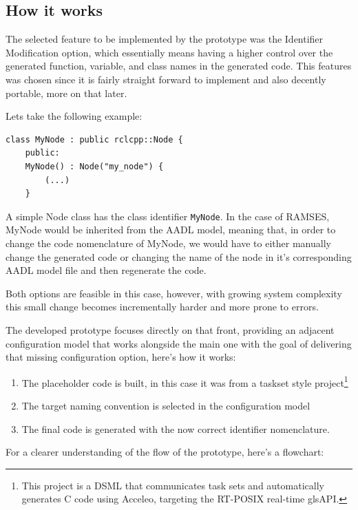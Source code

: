\subsection{How it works}
\label{sec:how_it_works}

The selected feature to be implemented by the prototype was the Identifier Modification option, which essentially means having a higher control over the generated function, variable, and class names in the generated code. This features was chosen since it is fairly straight forward to implement and also decently portable, more on that later. 

Lets take the following example:

\begin{verbatim}
class MyNode : public rclcpp::Node {
	public:
	MyNode() : Node("my_node") {
		(...)
	}
\end{verbatim}

A simple Node class has the class identifier \texttt{MyNode}. In the case of \gls{RAMSES}, MyNode would be inherited from the AADL model, meaning that, in order to change the code nomenclature of MyNode, we would have to either manually change the generated code or changing the name of the node in it's corresponding AADL model file and then regenerate the code.

Both options are feasible in this case, however, with growing system complexity this small change becomes incrementally harder and more prone to errors.

The developed prototype focuses directly on that front, providing an adjacent configuration model that works alongside the main one with the goal of delivering that missing configuration option, here's how it works:

\begin{enumerate}
	\item The placeholder code is built, in this case it was from a taskset style project\footnote{This project is a \gls{DSML} that communicates task sets and automatically generates C code using Acceleo, targeting the RT-POSIX real-time gls{API}.}
	\item The target naming convention is selected in the configuration model
	\item The final code is generated with the now correct identifier nomenclature.
\end{enumerate}
 
 
For a clearer understanding of the flow of the prototype, here's a flowchart:

